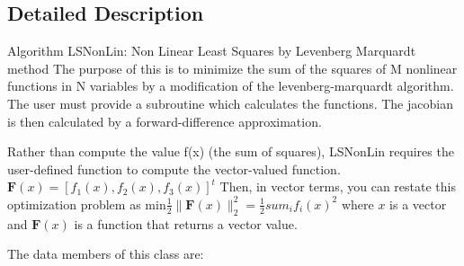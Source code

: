 \subsection{Detailed Description}
Algorithm L\+S\+Non\+Lin\+: Non Linear Least Squares by Levenberg Marquardt method The purpose of this is to minimize the sum of the squares of M nonlinear functions in N variables by a modification of the levenberg-\/marquardt algorithm. The user must provide a subroutine which calculates the functions. The jacobian is then calculated by a forward-\/difference approximation.

Rather than compute the value f(x) (the sum of squares), L\+S\+Non\+Lin requires the user-\/defined function to compute the vector-\/valued function. $ \textbf{F}(x) = [f_1(x), f_2(x), f_3(x)]^{t} $ Then, in vector terms, you can restate this optimization problem as $ \mbox{min} \frac{1}{2} \| \textbf{F}(x) \|_2^2 = \frac{1}{2} sum_i f_i(x)^2 $ where $x$ is a vector and $\textbf{F}(x)$ is a function that returns a vector value.

The data members of this class are\+:


